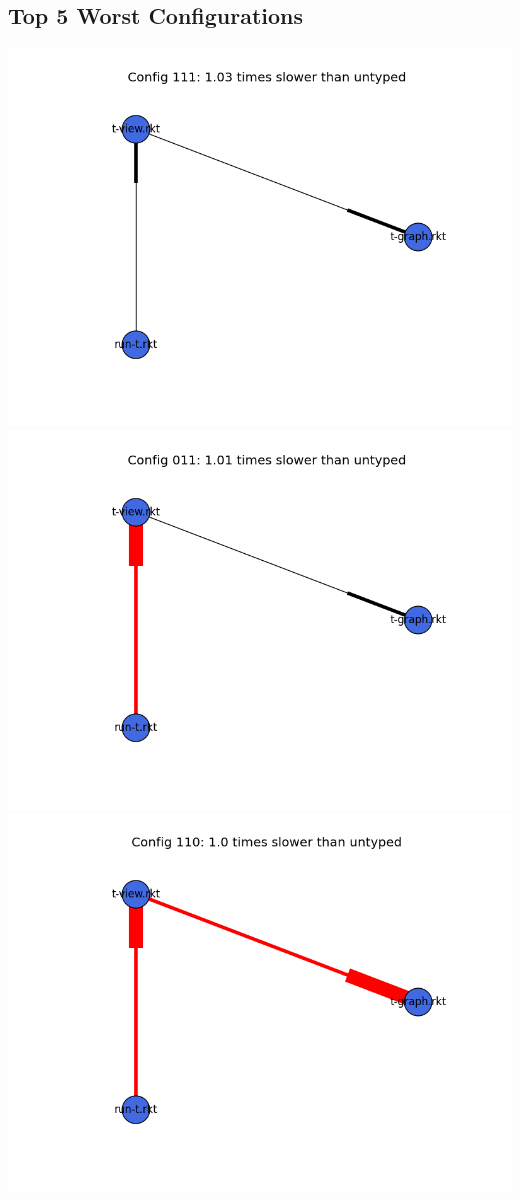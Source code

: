 \documentclass{article}
\begin{document}
\begin{itemize}
\subsection{Top 5 Worst Configurations}
\includegraphics[width=\textwidth]{mbta-rs-module-graph-111.png}
\includegraphics[width=\textwidth]{mbta-rs-module-graph-011.png}
\includegraphics[width=\textwidth]{mbta-rs-module-graph-110.png}

\end{itemize}
\end{document}
